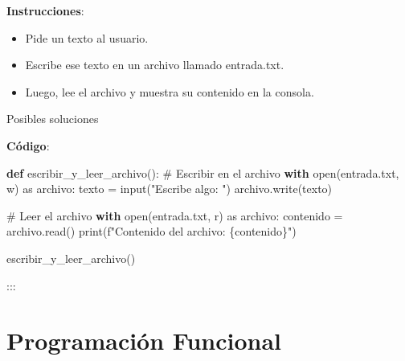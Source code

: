 \documentclass[
  a4paper,
  DIV=11,
  numbers=noendperiod,
  onepage,
  openany]{scrreprt}
\newenvironment{Shaded}{\begin{snugshade}}{\end{snugshade}}
\newcommand{\BuiltInTok}[1]{\textcolor[rgb]{0.00,0.23,0.31}{#1}}
\newcommand{\CommentTok}[1]{\textcolor[rgb]{0.37,0.37,0.37}{#1}}
\newcommand{\ControlFlowTok}[1]{\textcolor[rgb]{0.00,0.23,0.31}{\textbf{#1}}}
\newcommand{\ImportTok}[1]{\textcolor[rgb]{0.00,0.46,0.62}{#1}}
\newcommand{\KeywordTok}[1]{\textcolor[rgb]{0.00,0.23,0.31}{\textbf{#1}}}
\newcommand{\NormalTok}[1]{\textcolor[rgb]{0.00,0.23,0.31}{#1}}
\newcommand{\OperatorTok}[1]{\textcolor[rgb]{0.37,0.37,0.37}{#1}}
\newcommand{\SpecialCharTok}[1]{\textcolor[rgb]{0.37,0.37,0.37}{#1}}
\newcommand{\SpecialStringTok}[1]{\textcolor[rgb]{0.13,0.47,0.30}{#1}}
\newcommand{\StringTok}[1]{\textcolor[rgb]{0.13,0.47,0.30}{#1}}
\begin{document}
\textbf{Instrucciones}:

\begin{itemize}
\item
  Pide un texto al usuario.
\item
  Escribe ese texto en un archivo llamado entrada.txt.
\item
  Luego, lee el archivo y muestra su contenido en la consola.
\end{itemize}

Posibles soluciones

\textbf{Código}:

\begin{Shaded}
\begin{Highlighting}[]
\KeywordTok{def}\NormalTok{ escribir\_y\_leer\_archivo():}
    \CommentTok{\# Escribir en el archivo}
    \ControlFlowTok{with} \BuiltInTok{open}\NormalTok{(}\StringTok{\textquotesingle{}entrada.txt\textquotesingle{}}\NormalTok{, }\StringTok{\textquotesingle{}w\textquotesingle{}}\NormalTok{) }\ImportTok{as}\NormalTok{ archivo:}
\NormalTok{        texto }\OperatorTok{=} \BuiltInTok{input}\NormalTok{(}\StringTok{"Escribe algo: "}\NormalTok{)}
\NormalTok{        archivo.write(texto)}
    
    \CommentTok{\# Leer el archivo}
    \ControlFlowTok{with} \BuiltInTok{open}\NormalTok{(}\StringTok{\textquotesingle{}entrada.txt\textquotesingle{}}\NormalTok{, }\StringTok{\textquotesingle{}r\textquotesingle{}}\NormalTok{) }\ImportTok{as}\NormalTok{ archivo:}
\NormalTok{        contenido }\OperatorTok{=}\NormalTok{ archivo.read()}
        \BuiltInTok{print}\NormalTok{(}\SpecialStringTok{f"Contenido del archivo: }\SpecialCharTok{\{}\NormalTok{contenido}\SpecialCharTok{\}}\SpecialStringTok{"}\NormalTok{)}

\NormalTok{escribir\_y\_leer\_archivo()}
\end{Highlighting}
\end{Shaded}

:::

\chapter{Programación Funcional}\label{programaciuxf3n-funcional}
\end{document}
